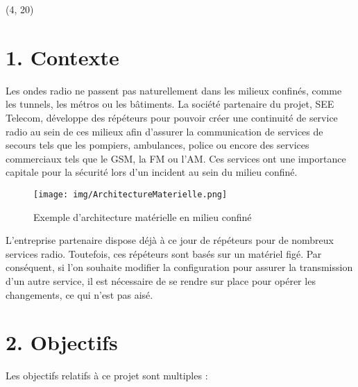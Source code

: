 \documentclass{beamer}
\begin{document}
\setlength{\TPHorizModule}{1cm}
\setlength{\TPVertModule}{1cm}


\maketitle

\begin{textblock}{36}(4, 20)
	\begin{minipage}{0.99\textwidth}
	\section{1. Contexte}
		Les ondes radio ne passent pas naturellement dans les milieux confinés, comme les tunnels, les métros ou les bâtiments. La société partenaire du projet, SEE Telecom, développe des répéteurs pour pouvoir créer une continuité de service radio au sein de ces milieux afin d'assurer la communication de services de secours tels que les pompiers, ambulances, police ou encore des services commerciaux tels que le GSM, la FM ou l'AM. Ces services ont une importance capitale pour la sécurité lors d'un incident au sein du milieu confiné.
		\begin{figure}[!ht]
		\centering
		\texttt{[image: img/ArchitectureMaterielle.png]}
		\caption{Exemple d'architecture matérielle en milieu confiné}
		\end{figure}
		L'entreprise partenaire dispose déjà à ce jour de répéteurs pour de nombreux services radio. Toutefois, ces répéteurs sont basés sur un matériel figé. Par conséquent, si l'on souhaite modifier la configuration pour assurer la transmission d'un autre service, il est nécessaire de se rendre sur place pour opérer les changements, ce qui n'est pas aisé.
		
		
	\section{2. Objectifs}
		Les objectifs relatifs à ce projet sont multiples :
	\end{minipage}
\end{textblock}
\end{document}
